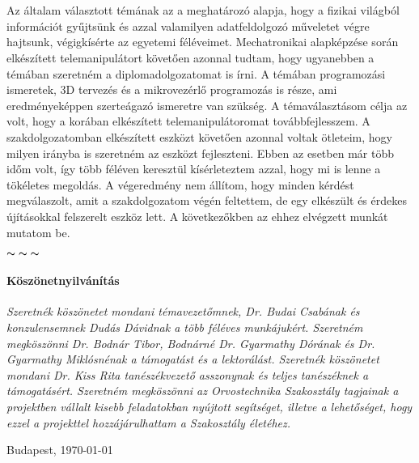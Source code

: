 \chapter*{\eloszo}

Az általam választott témának az a meghatározó alapja, hogy a fizikai világból információt
gyűjtsünk és azzal valamilyen adatfeldolgozó műveletet végre hajtsunk, végigkísérte
az egyetemi féléveimet. Mechatronikai alapképzése során elkészített telemanipulátort követően azonnal tudtam, hogy ugyanebben a témában szeretném a diplomadolgozatomat is írni. A témában programozási ismeretek, 3D tervezés és a mikrovezérlő programozás is része, ami eredményeképpen szerteágazó ismeretre van szükség. A témaválasztásom célja az volt, hogy a korában elkészített telemanipulátoromat továbbfejlesszem. A szakdolgozatomban elkészített eszközt követően azonnal voltak ötleteim, hogy milyen irányba is szeretném az eszközt fejleszteni. Ebben az esetben már több időm volt, így több féléven keresztül kísérleteztem azzal, hogy mi is lenne a tökéletes megoldás. A végeredmény nem állítom, hogy minden kérdést megválaszolt, amit a szakdolgozatom végén feltettem, de egy elkészült és érdekes újításokkal felszerelt eszköz lett. A következőkben az ehhez elvégzett munkát mutatom be.

\begin{center}
    $\thicksim \; \thicksim \; \thicksim$
\end{center}


\subsubsection*{Köszönetnyilvánítás}
\emph{Szeretnék köszönetet mondani témavezetőmnek, Dr. Budai Csabának és konzulensemnek Dudás Dávidnak a több féléves munkájukért. Szeretném megköszönni Dr. Bodnár Tibor, Bodnárné Dr. Gyarmathy Dórának és Dr. Gyarmathy Miklósnénak a támogatást és a lektorálást. Szeretnék köszönetet mondani Dr. Kiss Rita tanészékvezető asszonynak és teljes tanészéknek a támogatásért. Szeretném megköszönni az Orvostechnika Szakosztály tagjainak a projektben vállalt kisebb feladatokban nyújtott segítséget, illetve a lehetőséget, hogy ezzel a projekttel hozzájárulhattam a Szakosztály életéhez.} 


\vspace{0.5cm}

\begin{flushleft}
{Budapest, \today}
\end{flushleft}

\begin{flushright}
\emph{\authorName}
\end{flushright}

\vfill
